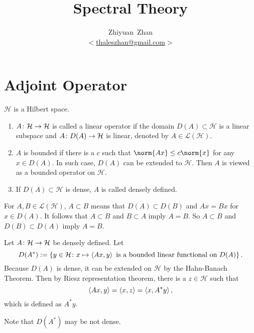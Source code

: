 \documentclass[a4paper,12pt]{article}
\title{Spectral Theory}
\author{Zhiyuan~Zhan\\ $<$\href{mailto:thaleszhan@gmail.com}%
            {thaleszhan@gmail.com}$>$}
\begin{document}
\maketitle
\tableofcontents

\newpage
\section{Adjoint Operator}

\begin{defn}
    $\mathcal{H}$ is a Hilbert space.
    \begin{enumerate}[label=(\arabic{*})]
        \item $A \colon \mathcal{H} \rightarrow \mathcal{H}$ is called a linear operator if the domain $D(A) \subset \mathcal{H}$ is a linear subspace and $A \colon D(A) \rightarrow \mathcal{H}$ is linear, denoted by $A \in \mathcal{L}(\mathcal{H})$.
        \item $A$ is bounded if there is a $c$ such that $\norm{Ax} \leq c\norm{x}$ for any $x \in D(A)$. In such case, $D(A)$ can be extended to $\mathcal{H}$. Then $A$ is viewed as a bounded operator on $\mathcal{H}$.
        \item If $D(A) \subset \mathcal{H}$ is dense, $A$ is called densely defined.
    \end{enumerate}
\end{defn}
\begin{rmk}
    For $A,B \in \mathcal{L}(\mathcal{H})$, $A \subset B$ means that $D(A) \subset D(B)$ and $Ax = Bx$ for $x \in D(A)$. It follows that $A \subset B$ and $B \subset A$ imply $A = B$. So $A \subset B$ and $D(B) \subset D(A)$ imply $A=B$.
\end{rmk}

\begin{defn}
    Let $A \colon \mathcal{H} \rightarrow \mathcal{H}$ be densely defined. Let
    \begin{equation*}
        D(A^*) \vcentcolon= \left\{y \in \mathcal{H} \colon x \mapsto \left\langle Ax,y \right\rangle \text{ is a bounded linear functional on } D(A)\right\}.
    \end{equation*}
    Because $D(A)$ is dense, it can be extended on $\mathcal{H}$ by the Hahn-Banach Theorem. Then by Riesz representation theorem, there is a $z \in \mathcal{H}$ such that
    \begin{equation*}
        \left\langle Ax,y \right\rangle = \left\langle x,z \right\rangle = \left\langle x,A^*y \right\rangle,
    \end{equation*}
    which is defined as $A^*y$.
\end{defn}
\begin{rmk}
    Note that $D(A^*)$ may be not dense.
\end{rmk}
\end{document}
